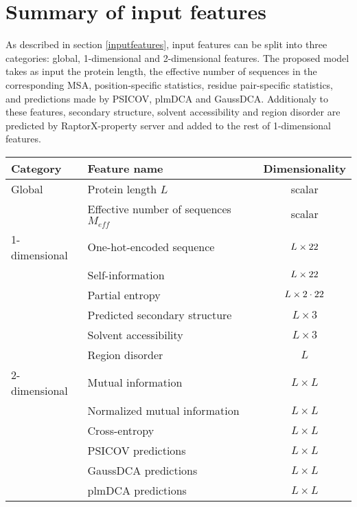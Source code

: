 \section{Summary of input features}

  As described in section \ref{inputfeatures}, input features can be split into three categories:
  global, 1-dimensional and 2-dimensional features.
  The proposed model takes as input the protein length, the effective number of sequences
  in the corresponding MSA, position-specific statistics,
  residue pair-specific statistics, and predictions made by PSICOV, plmDCA and GaussDCA.
  Additionaly to these features, secondary structure, solvent accessibility and
  region disorder are predicted by RaptorX-property server and added to the rest of
  1-dimensional features.

  \begin{table}[H]
    \centering
    \begin{tabular}{|l|l|c|}
      \hline
      Category & Feature name & Dimensionality \\
      \hline
      \hline
      Global & Protein length $L$ & scalar \\
             & Effective number of sequences $M_{eff}$ & scalar \\
      \hline
      1-dimensional & One-hot-encoded sequence & $L \times 22$ \\
                    & Self-information & $L \times 22$ \\
                    & Partial entropy & $L \times 2 \cdot 22$ \\
                    & Predicted secondary structure & $L \times 3$ \\
                    & Solvent accessibility & $L \times 3$ \\
                    & Region disorder & $L$ \\
      \hline
      2-dimensional & Mutual information & $L \times L$ \\
                    & Normalized mutual information & $L \times L$ \\
                    & Cross-entropy & $L \times L$ \\
                    & PSICOV predictions & $L \times L$ \\
                    & GaussDCA predictions & $L \times L$ \\
                    & plmDCA predictions & $L \times L$ \\
      \hline
    \end{tabular}
    \label{hyperparams}
  \end{table}